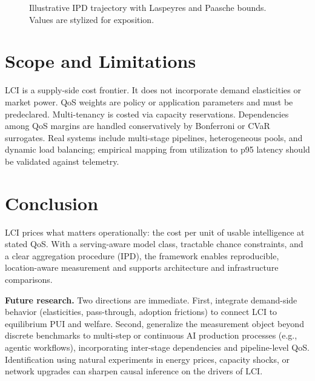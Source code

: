 \documentclass[12pt]{article}
\numberwithin{equation}{section}
\theoremstyle{definition}
\theoremstyle{plain}
\newcommand{\LCI}{\mathrm{LCI}}
\begin{document}
\begin{figure}[t]
\centering
{}
\caption{Illustrative IPD trajectory with Laspeyres and Paasche bounds. Values are stylized for exposition.}
\label{fig:ipd}
\end{figure}

\section{Scope and Limitations}
LCI is a supply-side cost frontier. It does not incorporate demand elasticities or market power. QoS weights are policy or application parameters and must be predeclared. Multi-tenancy is costed via capacity reservations. Dependencies among QoS margins are handled conservatively by Bonferroni or CVaR surrogates. Real systems include multi-stage pipelines, heterogeneous pools, and dynamic load balancing; empirical mapping from utilization to p95 latency should be validated against telemetry.

\section{Conclusion}
LCI prices what matters operationally: the cost per unit of usable intelligence at stated QoS. With a serving-aware model class, tractable chance constraints, and a clear aggregation procedure (IPD), the framework enables reproducible, location-aware measurement and supports architecture and infrastructure comparisons.
\par\medskip\noindent\textbf{Future research.} Two directions are immediate. First, integrate demand-side behavior (elasticities, pass-through, adoption frictions) to connect LCI to equilibrium PUI and welfare. Second, generalize the measurement object beyond discrete benchmarks to multi-step or continuous AI production processes (e.g., agentic workflows), incorporating inter-stage dependencies and pipeline-level QoS. Identification using natural experiments in energy prices, capacity shocks, or network upgrades can sharpen causal inference on the drivers of $\LCI$.
\end{document}
